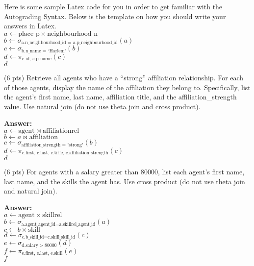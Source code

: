 Here is some sample Latex code for you in order to get familiar with the Autograding Syntax. Below is the template on how you should write your answers in Latex.\\
$a \leftarrow \text{place p} \times \text{neighbourhood n}$\\
$b \leftarrow \sigma_{\text{a.n\_neighbourhood\_id = a.p\_neighbourhood\_id}}(a)$\\
$c \leftarrow \sigma_{\text{b.n\_name = `Harlem'}}(b)$\\
$d \leftarrow \pi_{\text{c.id, c.p\_name}}(c)$\\
$d$

\begin{questions}
\question (6 pts) Retrieve all agents who have a “strong” affiliation relationship. For each of those agents, display the name of the affiliation they belong to. Specifically, list the agent’s first name, last name, affiliation title, and the affiliation\_strength value. Use natural join (do not use theta join and cross product). 

\textbf{Answer:} \\
$a \leftarrow \text{agent} \bowtie \text{affiliationrel}$\\
$b \leftarrow a \bowtie \text{affiliation}$\\
$c \leftarrow \sigma_{\text{affiliation\_strength = 'strong'}}(b)$\\
$d \leftarrow \pi_{\text{c.first, c.last, c.title, c.affiliation\_strength}}(c)$\\
$d$


\vspace{15 mm}
	
\question (6 pts) For agents with a salary greater than 80000, list each agent’s first name, last name, and the skills the agent has. Use cross product (do not use theta join and natural join).

\textbf{Answer:} \\ 
$a \leftarrow \text{agent} \times \text{skillrel}$\\
$b \leftarrow \sigma_{\text{a.agent_agent\_id} = \text{a.skillrel_agent\_id}}(a)$\\
$c \leftarrow b \times \text{skill}$\\
$d \leftarrow \sigma_{\text{c.b_skill_id} = \text{c.skill_skill_id}}(c)$\\
$e \leftarrow \sigma_{\text{d.salary} > 80000}(d)$\\
$f \leftarrow \pi_{\text{e.first, e.last, e.skill}}(e)$\\
$f$



\end{questions}
